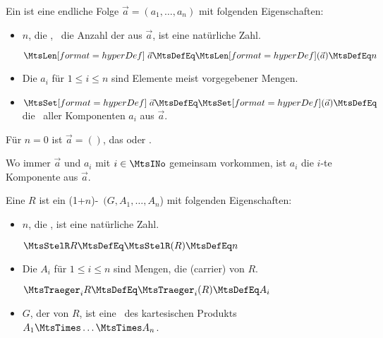 \begin{description}

	\item[\Folge] %

	\item [\Tupel] Ein  ist eine endliche Folge $\vec{a} = (a_1, \dots, a_n)$ mit folgenden Eigenschaften:
	\begin{itemize}
		\item $n$, die , \textdh\ die Anzahl der  aus $\vec{a}$, ist eine natürliche Zahl.

		$\defSymUna{\MtsLen} \vec{a} \MtsDefEq \defSym{\MtsLen}(\vec{a}) \MtsDefEq n$
		\item Die $a_i$ für $1 \le i \le n$ sind Elemente meist vorgegebener Mengen.
		\item $\defSymUna{\MtsSet} \vec{a} \MtsDefEq \defSym{\MtsSet}(\vec{a}) \MtsDefEq$ die \Menge\ aller Komponenten $a_i$ aus $\vec{a}$.
	\end{itemize}
	Für $n=0$ ist $\vec{a} = ()$, das  oder .

	Wo immer $\vec{a}$ und $a_i$ mit $i \in \MtsINo$ gemeinsam vorkommen, ist $a_i$ die $i$-te Komponente aus $\vec{a}$.

	\item [\Relation] Eine  $R$ ist ein (1+$n$)-\Tupel\ $(G,A_1,\dots,A_n$) mit folgenden Eigenschaften:
	\begin{itemize}
		\item $n$, die , ist eine natürliche Zahl.

		$\MtsStelR R \MtsDefEq \MtsStelR(R) \MtsDefEq n$
		\item Die $A_i$ für $1 \le i \le n$ sind Mengen, die  (carrier) von $R$.

		$\MtsTraeger_i R \MtsDefEq \MtsTraeger_i(R) \MtsDefEq A_i$
		\item $G$, der  von $R$, ist eine \Teilmenge\ des kartesischen Produkts $A_1 \MtsTimes \dots \MtsTimes A_n$.


\end{itemize}
\end{description}
